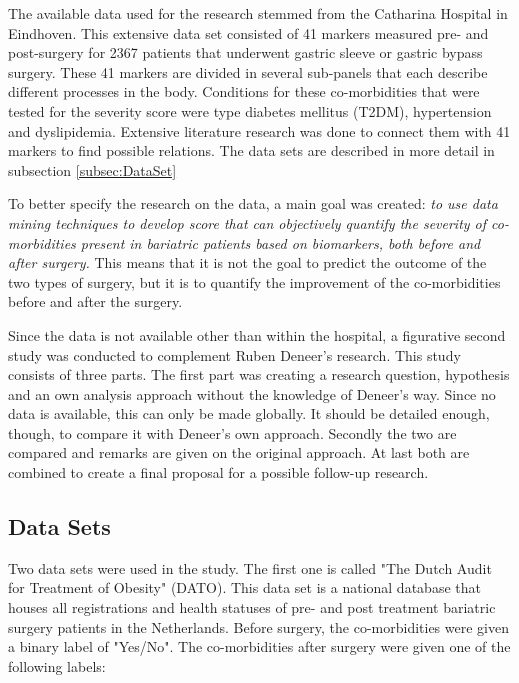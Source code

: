\documentclass[10pt,a4paper]{article}
\begin{document}
	The available data used for the research stemmed from the Catharina Hospital in Eindhoven. This extensive data set consisted of 41 markers measured pre- and post-surgery for 2367 patients that underwent gastric sleeve or gastric bypass surgery. These 41 markers are divided in several sub-panels that each describe different processes in the body. Conditions for these co-morbidities that were tested for the severity score were type diabetes mellitus (T2DM), hypertension and dyslipidemia. Extensive literature research was done to connect them with 41 markers to find possible relations. \cite{Deneer2017Thesis} The data sets are described in more detail in subsection \ref{subsec:DataSet}

	To better specify the research on the data, a main goal was created: \emph{to use data mining techniques to develop score that can objectively quantify the severity of co-morbidities present in bariatric patients based on biomarkers, both before and after surgery.} This means that it is not the goal to predict the outcome of the two types of surgery, but it is to quantify the improvement of the co-morbidities before and after the surgery. \cite{Deneer2017Thesis}

	Since the data is not available other than within the hospital, a figurative second study was conducted to complement Ruben Deneer's research. This study consists of three parts. The first part was creating a research question, hypothesis and an own analysis approach without the knowledge of Deneer's way. Since no data is available, this can only be made globally. It should be detailed enough, though, to compare it with Deneer's own approach. Secondly the two are compared and remarks are given on the original approach. At last both are combined to create a final proposal for a possible follow-up research. 
	
	\subsection{Data Sets}
	\label{subsec:DATODataSet}
	
	Two data sets were used in the study. The first one is called "The Dutch Audit for Treatment of Obesity" (DATO). This data set is a national database that houses all registrations and health statuses of pre- and post treatment bariatric surgery patients in the Netherlands. Before surgery, the co-morbidities were given a binary label of "Yes/No". The co-morbidities after surgery were given one of the following labels:
	
\end{document}
